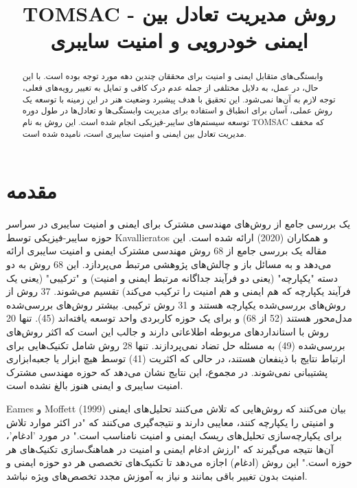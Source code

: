 \documentclass[a4paper,10pt]{article}
\title{TOMSAC - روش مدیریت تعادل بین ایمنی خودرویی و امنیت سایبری}
\author{}
\date{}
\begin{document}
    \maketitle

    \begin{abstract}
        
        وابستگی‌های متقابل ایمنی و امنیت برای محققان چندین دهه مورد توجه بوده است. با این حال، در عمل، به دلایل مختلفی از جمله عدم درک کافی و تمایل به تغییر رویه‌های فعلی، توجه لازم به آن‌ها نمی‌شود. این تحقیق با هدف پیشبرد وضعیت هنر در این زمینه با توسعه یک روش عملی، آسان برای انطباق و استفاده برای مدیریت وابستگی‌ها و تعادل‌ها در طول دوره توسعه سیستم‌های سایبر-فیزیکی انجام شده است. این روش به نام TOMSAC که مخفف مدیریت تعادل بین ایمنی و امنیت سایبری است، نامیده شده است.

    \end{abstract}

    \section{مقدمه}

        یک بررسی جامع از روش‌های مهندسی مشترک برای ایمنی و امنیت سایبری در سراسر حوزه سایبر-فیزیکی توسط Kavallieratos و همکاران (2020) ارائه شده است. این مقاله یک بررسی جامع از 68 روش مهندسی مشترک ایمنی و امنیت سایبری ارائه می‌دهد و به مسائل باز و چالش‌های پژوهشی مرتبط می‌پردازد. این 68 روش به دو دسته "یکپارچه" (یعنی دو فرآیند جداگانه مرتبط ایمنی و امنیت) و "ترکیبی" (یعنی یک فرآیند یکپارچه که هم ایمنی و هم امنیت را ترکیب می‌کند) تقسیم می‌شوند. 37 روش از روش‌های بررسی‌شده یکپارچه هستند و 31 روش ترکیبی. بیشتر روش‌های بررسی‌شده مدل‌محور هستند (52 از 68) و برای یک حوزه کاربردی واحد توسعه یافته‌اند (45). تنها 20 روش با استانداردهای مربوطه اطلاعاتی دارند و جالب این است که اکثر روش‌های بررسی‌شده (49) به مسئله حل تضاد نمی‌پردازند. تنها 28 روش شامل تکنیک‌هایی برای ارتباط نتایج با ذینفعان هستند، در حالی که اکثریت (41) توسط هیچ ابزار یا جعبه‌ابزاری پشتیبانی نمی‌شوند. در مجموع، این نتایج نشان می‌دهد که حوزه مهندسی مشترک امنیت سایبری و ایمنی هنوز بالغ نشده است.

        Eames و Moffett (1999) بیان می‌کنند که روش‌هایی که تلاش می‌کنند تحلیل‌های ایمنی و امنیتی را یکپارچه کنند، معایبی دارند و نتیجه‌گیری می‌کنند که "در اکثر موارد تلاش برای یکپارچه‌سازی تحلیل‌های ریسک ایمنی و امنیت نامناسب است." در مورد 'ادغام'، آن‌ها نتیجه می‌گیرند که "ارزش ادغام ایمنی و امنیت در هماهنگ‌سازی تکنیک‌های هر حوزه است." این روش (ادغام) اجازه می‌دهد تا تکنیک‌های تخصصی هر دو حوزه ایمنی و امنیت بدون تغییر باقی بمانند و نیاز به آموزش مجدد تخصص‌های ویژه نباشد.
\end{document}
